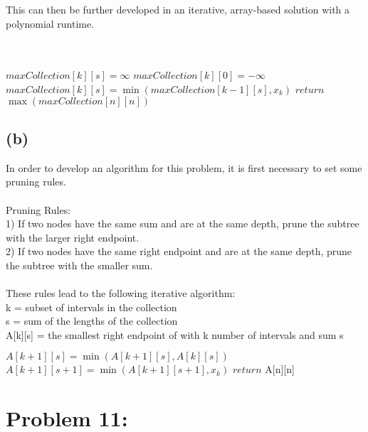 \documentclass[12pt]{article}
\begin{document}
This can then be further developed in an iterative, array-based solution with a polynomial runtime.\\\\
\begin{algorithm}[H]
\Init\\
{
{$maxCollection[k][s] = \infty$}
}
{$maxCollection[k][0] = -\infty$}
\EndInit\\
{
{
{
{$maxCollection[k][s] = \min(maxCollection[k - 1][s], x_k)$}
}
}
}
{$return$ $\max(maxCollection[n][n])$}
\end{algorithm}
\subsection*{(b)}
In order to develop an algorithm for this problem, it is first necessary to set some pruning rules.\\\\
Pruning Rules: \\
1) If two nodes have the same sum and are at the same depth, prune the subtree with the larger right endpoint.\\
2) If two nodes have the same right endpoint and are at the same depth, prune the subtree with the smaller sum.\\\\
These rules lead to the following iterative algorithm:\\
k = subset of intervals in the collection\\
s = sum of the lengths of the collection\\
A[k][s] = the smallest right endpoint of with k number of intervals and sum s\\
\begin{algorithm}[H]
{
{
{$A[k+1][s] = \min(A[k+1][s], A[k][s])$}
{$A[k+1][s+1] = \min(A[k+1][s+1], x_k)$}
}
}
{$return$ A[n][n]}
\end{algorithm}
\section*{Problem 11: }
\end{document}
